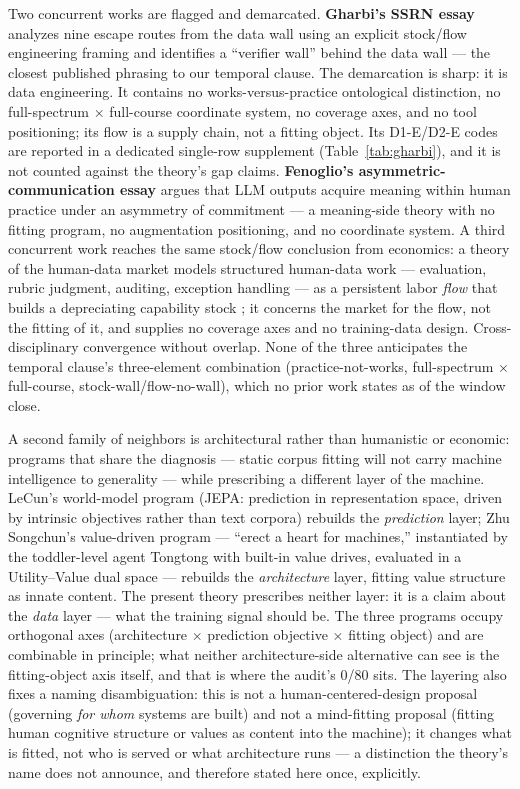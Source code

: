 \documentclass[10pt]{article}
\begin{document}
Two concurrent works are flagged and demarcated. \textbf{Gharbi's SSRN essay} \cite{gharbi2026model} analyzes nine escape routes from the data wall using an explicit stock/flow engineering framing and identifies a ``verifier wall'' behind the data wall --- the closest published phrasing to our temporal clause. The demarcation is sharp: it is data engineering. It contains no works-versus-practice ontological distinction, no full-spectrum $\times$ full-course coordinate system, no coverage axes, and no tool positioning; its flow is a supply chain, not a fitting object. Its D1-E/D2-E codes are reported in a dedicated single-row supplement (Table~\ref{tab:gharbi}), and it is not counted against the theory's gap claims. \textbf{Fenoglio's asymmetric-communication essay} \cite{fenoglio2026asymmetric} argues that LLM outputs acquire meaning within human practice under an asymmetry of commitment --- a meaning-side theory with no fitting program, no augmentation positioning, and no coordinate system. A third concurrent work reaches the same stock/flow conclusion from economics: a theory of the human-data market models structured human-data work --- evaluation, rubric judgment, auditing, exception handling --- as a persistent labor \emph{flow} that builds a depreciating capability stock \cite{ansari2026nolastmile}; it concerns the market for the flow, not the fitting of it, and supplies no coverage axes and no training-data design. Cross-disciplinary convergence without overlap. None of the three anticipates the temporal clause's three-element combination (practice-not-works, full-spectrum $\times$ full-course, stock-wall/flow-no-wall), which no prior work states as of the window close.

A second family of neighbors is architectural rather than humanistic or economic: programs that share the diagnosis --- static corpus fitting will not carry machine intelligence to generality --- while prescribing a different layer of the machine. LeCun's world-model program (JEPA: prediction in representation space, driven by intrinsic objectives rather than text corpora) \cite{lecun2022path} rebuilds the \emph{prediction} layer; Zhu Songchun's value-driven program --- ``erect a heart for machines,'' instantiated by the toddler-level agent Tongtong with built-in value drives, evaluated in a Utility--Value dual space \cite{zhao2024heart} --- rebuilds the \emph{architecture} layer, fitting value structure as innate content. The present theory prescribes neither layer: it is a claim about the \emph{data} layer --- what the training signal should be. The three programs occupy orthogonal axes (architecture $\times$ prediction objective $\times$ fitting object) and are combinable in principle; what neither architecture-side alternative can see is the fitting-object axis itself, and that is where the audit's 0/80 sits. The layering also fixes a naming disambiguation: this is not a human-centered-design proposal (governing \emph{for whom} systems are built) and not a mind-fitting proposal (fitting human cognitive structure or values as content into the machine); it changes what is fitted, not who is served or what architecture runs --- a distinction the theory's name does not announce, and therefore stated here once, explicitly.
\end{document}
